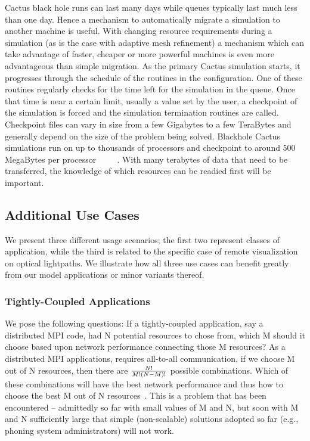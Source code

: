\documentclass[conference,final]{IEEEtran}
\begin{document}
Cactus black hole runs can last many days while queues typically last
much less than one day. Hence a mechanism to automatically migrate a
simulation to another machine is useful. With changing resource
requirements during a simulation (as is the case with adaptive mesh
refinement) a mechanism which can take advantage of faster, cheaper or
more powerful machines is even more advantageous than simple
migration. As the primary Cactus simulation starts, it progresses
through the schedule of the routines in the configuration. One of
these routines regularly checks for the time left for the simulation
in the queue. Once that time is near a certain limit, usually a value
set by the user, a checkpoint of the simulation is forced and the
simulation termination routines are called. Checkpoint files can vary
in size from a few Gigabytes to a few TeraBytes and generally depend
on the size of the problem being solved. Blackhole Cactus simulations
run on up to thousands of processors and checkpoint to around 500
MegaBytes per processor ~\cite{Cactus_CCTTR} ~\cite{Cactus_Kamil06a}
~\cite{Cactus_Shalf05a}. With many terabytes of data that need to be
transferred, the knowledge of which resources can be readied first
will be important.

\subsection{Additional Use Cases}

We present three different usage scenarios; the first two represent
classes of application, while the third is related to the specific
case of remote visualization on optical lightpaths. We illustrate how
all three use cases can benefit greatly from our model applications or
minor variants thereof.

\subsubsection{Tightly-Coupled Applications}

We pose the following questions: If a tightly-coupled application, say
a distributed MPI code, had N potential resources to chose from, which
M should it choose based upon network performance connecting those M
resources?  As a distributed MPI applications, requires all-to-all
communication, if we choose M out of N resources, then there are $N!
\over M! (N-M)!$ possible combinations.  Which of these combinations
will have the best network performance and thus how to choose the best
M out of N resources~\cite{clade06}.  This is a problem that has been
encountered -- admittedly so far with small values of M and N, but
soon with M and N sufficiently large that simple (non-scalable)
solutions adopted so far (e.g., phoning system administrators) will not
work.
\end{document}
